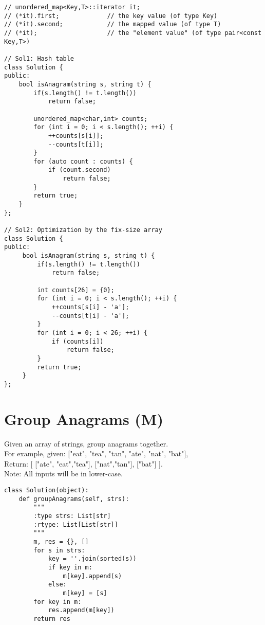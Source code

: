 \begin{lstlisting}
// unordered_map<Key,T>::iterator it;
// (*it).first;             // the key value (of type Key)
// (*it).second;            // the mapped value (of type T)
// (*it);                   // the "element value" (of type pair<const Key,T>)

// Sol1: Hash table
class Solution {
public:
    bool isAnagram(string s, string t) {
        if(s.length() != t.length())
            return false;
            
        unordered_map<char,int> counts;
        for (int i = 0; i < s.length(); ++i) {
            ++counts[s[i]];
            --counts[t[i]];
        }
        for (auto count : counts) {
            if (count.second)
                return false;
        }
        return true;
    }
};

// Sol2: Optimization by the fix-size array
class Solution {
public:
     bool isAnagram(string s, string t) {
         if(s.length() != t.length())
             return false;
            
         int counts[26] = {0};
         for (int i = 0; i < s.length(); ++i) {
             ++counts[s[i] - 'a'];
             --counts[t[i] - 'a'];
         }
         for (int i = 0; i < 26; ++i) {
             if (counts[i])
                 return false;
         }
         return true;
     }
};
\end{lstlisting}


\section{Group Anagrams (M)}
Given an array of strings, group anagrams together.\\

For example, given: ["eat", "tea", "tan", "ate", "nat", "bat"],\\
Return:
[
  ["ate", "eat","tea"],
  ["nat","tan"],
  ["bat"]
].\\

Note: All inputs will be in lower-case.\\
\begin{lstlisting}
class Solution(object):
    def groupAnagrams(self, strs):
        """
        :type strs: List[str]
        :rtype: List[List[str]]
        """
        m, res = {}, []
        for s in strs:
            key = ''.join(sorted(s))
            if key in m:
                m[key].append(s)
            else:
                m[key] = [s]
        for key in m:
            res.append(m[key])
        return res
\end{lstlisting}


